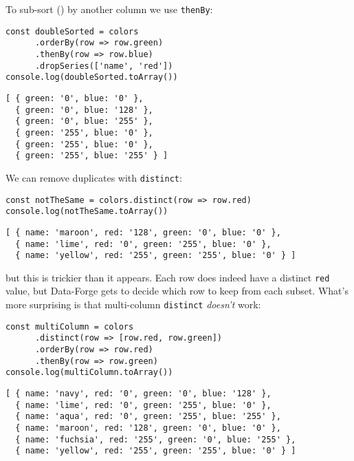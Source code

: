 \noindent
To sub-sort () by another column we use \texttt{thenBy}:

\begin{verbatim}
const doubleSorted = colors
      .orderBy(row => row.green)
      .thenBy(row => row.blue)
      .dropSeries(['name', 'red'])
console.log(doubleSorted.toArray())
\end{verbatim}

\begin{verbatim}
[ { green: '0', blue: '0' },
  { green: '0', blue: '128' },
  { green: '0', blue: '255' },
  { green: '255', blue: '0' },
  { green: '255', blue: '0' },
  { green: '255', blue: '255' } ]
\end{verbatim}


We can remove duplicates with \texttt{distinct}:

\begin{verbatim}
const notTheSame = colors.distinct(row => row.red)
console.log(notTheSame.toArray())
\end{verbatim}

\begin{verbatim}
[ { name: 'maroon', red: '128', green: '0', blue: '0' },
  { name: 'lime', red: '0', green: '255', blue: '0' },
  { name: 'yellow', red: '255', green: '255', blue: '0' } ]
\end{verbatim}

\noindent
but this is trickier than it appears.
Each row does indeed have a distinct \texttt{red} value,
but Data-Forge gets to decide which row to keep from each subset.
What's more surprising is that multi-column \texttt{distinct} \emph{doesn't} work:

\begin{verbatim}
const multiColumn = colors
      .distinct(row => [row.red, row.green])
      .orderBy(row => row.red)
      .thenBy(row => row.green)
console.log(multiColumn.toArray())
\end{verbatim}

\begin{verbatim}
[ { name: 'navy', red: '0', green: '0', blue: '128' },
  { name: 'lime', red: '0', green: '255', blue: '0' },
  { name: 'aqua', red: '0', green: '255', blue: '255' },
  { name: 'maroon', red: '128', green: '0', blue: '0' },
  { name: 'fuchsia', red: '255', green: '0', blue: '255' },
  { name: 'yellow', red: '255', green: '255', blue: '0' } ]
\end{verbatim}

